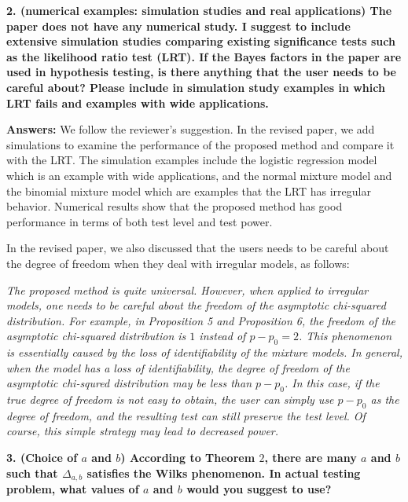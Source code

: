 \documentclass[11pt]{article}
\theoremstyle{plain}
\theoremstyle{definition}
\theoremstyle{remark}
\begin{document}
\textbf{
    2.
    (numerical examples: simulation studies and real applications) The paper does not have any numerical study. I suggest to include extensive simulation studies comparing existing significance tests such as the likelihood ratio test (LRT). If the Bayes factors in the paper are used in hypothesis testing, is there anything that the user needs to be careful about? Please include in simulation study examples in which LRT fails and examples with wide applications.
}

\textbf{Answers:}
We follow the reviewer's suggestion.
In the revised paper, we add simulations to examine the performance of the proposed method and compare it with the LRT.
The simulation examples include the logistic regression model which is an example with wide applications, and the normal mixture model and the binomial mixture model which are examples that the LRT has irregular behavior.
Numerical results show that the proposed method has good performance in terms of both test level and test power.

In the revised paper, we also discussed that the users needs to be careful about the degree of freedom when they deal with irregular models, as follows:

\begin{adjustwidth}{1.5em}{1.5em}
    \emph{
The proposed method is quite universal. 
However, when applied to irregular models, one needs to be careful about the freedom of the asymptotic chi-squared distribution.
For example, in Proposition 5 and Proposition 6, the freedom of the asymptotic chi-squared distribution is $1$ instead of $p-p_0 = 2$.
This phenomenon is essentially caused by the loss of identifiability of the mixture models.
In general, when the model has a loss of identifiability, the degree of freedom of the asymptotic chi-squred distribution may be less than $p-p_0$.
In this case, if the true degree of freedom is not easy to obtain, the user can simply use $p-p_0$ as the degree of freedom, and the resulting test can still preserve the test level.
Of course, this simple strategy may lead to decreased power.
}
\end{adjustwidth}


\textbf{
    3. (Choice of $a$ and $b$) According to Theorem $2$, there are many $a$ and $b$ such that $\Delta_{a,b}$ satisfies the Wilks phenomenon.
    In actual testing problem, what values of $a$ and $b$ would you suggest to use?
}
\end{document}
